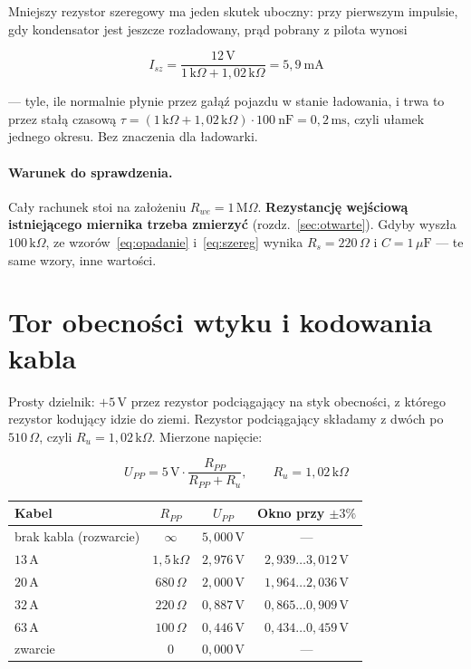 \documentclass[a4paper,11pt]{article}
\newcommand{\ohm}{\,\Omega}
\newcommand{\kohm}{\,\mathrm{k}\Omega}
\newcommand{\Mohm}{\,\mathrm{M}\Omega}
\newcommand{\volt}{\,\mathrm{V}}
\newcommand{\amp}{\,\mathrm{A}}
\newcommand{\ms}{\,\mathrm{ms}}
\begin{document}
Mniejszy rezystor szeregowy ma jeden skutek uboczny: przy pierwszym impulsie,
gdy kondensator jest jeszcze rozładowany, prąd pobrany z pilota wynosi

\[
I_{sz}=\frac{12\volt}{1\kohm + 1{,}02\kohm}=5{,}9\ \mathrm{mA}
\]

--- tyle, ile normalnie płynie przez gałąź pojazdu w stanie ładowania, i trwa to
przez stałą czasową $\tau=(1\kohm+1{,}02\kohm)\cdot100\ \mathrm{nF}=0{,}2\ms$,
czyli ułamek jednego okresu. Bez znaczenia dla ładowarki.

\paragraph{Warunek do sprawdzenia.} Cały rachunek stoi na założeniu
$R_{we}=1\Mohm$. \textbf{Rezystancję wejściową istniejącego miernika trzeba
zmierzyć} (rozdz.~\ref{sec:otwarte}). Gdyby wyszła $100\kohm$, ze
wzorów~\eqref{eq:opadanie} i~\eqref{eq:szereg} wynika $R_s=220\ohm$
i $C=1\,\mu\mathrm{F}$ --- te same wzory, inne wartości.

\section{Tor obecności wtyku i kodowania kabla}

Prosty dzielnik: $+5\volt$ przez rezystor podciągający na styk obecności,
z którego rezystor kodujący idzie do ziemi. Rezystor podciągający składamy
z dwóch po $510\ohm$, czyli $R_u=1{,}02\kohm$. Mierzone napięcie:

\begin{equation}
U_{PP}=5\volt\cdot\frac{R_{PP}}{R_{PP}+R_u},
\qquad R_u=1{,}02\kohm
\end{equation}

\begin{center}
\begin{tabular}{lccc}
\toprule
Kabel & $R_{PP}$ & $U_{PP}$ & Okno przy $\pm3\%$ \\
\midrule
brak kabla (rozwarcie) & $\infty$        & $5{,}000\volt$ & --- \\
$13\amp$               & $1{,}5\kohm$    & $2{,}976\volt$ & $2{,}939\ldots3{,}012\volt$ \\
$20\amp$               & $680\ohm$       & $2{,}000\volt$ & $1{,}964\ldots2{,}036\volt$ \\
$32\amp$               & $220\ohm$       & $0{,}887\volt$ & $0{,}865\ldots0{,}909\volt$ \\
$63\amp$               & $100\ohm$       & $0{,}446\volt$ & $0{,}434\ldots0{,}459\volt$ \\
zwarcie                & $0$             & $0{,}000\volt$ & --- \\
\bottomrule
\end{tabular}
\end{center}
\end{document}
